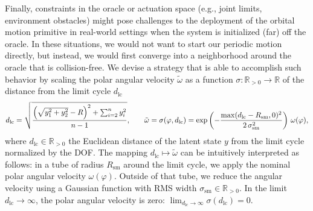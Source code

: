 Finally, constraints in the oracle or actuation space (e.g., joint limits, environment obstacles) might pose challenges to the deployment of the orbital motion primitive in real-world settings when the system is initialized (far) off the oracle.
In these situations, we would not want to start our periodic motion directly, but instead, we would first converge into a neighborhood around the oracle that is collision-free. We devise a strategy that is able to accomplish such behavior by scaling the polar angular velocity $\tilde{\omega}$ as a function $\sigma: \mathbb{R}_{>0} \to \mathbb{R}$ of the distance from the limit cycle $d_\mathrm{lc}$
\begin{equation}\small
    d_\mathrm{lc} = \sqrt{\frac{\left (\sqrt{y_1^2 + y_2^2} - R \right)^2 + \sum_{i=2}^{n} y_i^2}{n-1}},
    \qquad
    \tilde{\omega} = \sigma(\varphi, d_\mathrm{lc}) = \exp \left ( - \frac{\max(d_\mathrm{lc} - R_\mathrm{sm}, 0)^2}{2 \, \sigma_\mathrm{sm}^2} \right ) \, \omega(\varphi),
\end{equation}
where $d_\mathrm{lc} \in \mathbb{R}_{>0}$ the Euclidean distance of the latent state $y$ from the limit cycle normalized by the DOF.
The mapping $d_\mathrm{lc} \mapsto \tilde{\omega}$ can be intuitively interpreted as follows: in a tube of radius $R_\mathrm{sm}$ around the limit cycle, we apply the nominal polar angular velocity $\omega(\varphi)$. Outside of that tube, we reduce the angular velocity using a Gaussian function with RMS width $\sigma_\mathrm{sm} \in \mathbb{R}_{>0}$. In the limit $d_\mathrm{lc} \to \infty$, the polar angular velocity is zero: $\lim_{d_\mathrm{lc} \to \infty} \sigma(d_\mathrm{lc}) = 0$.


